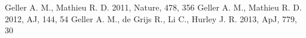 \documentclass{aastex62}
\begin{document}
\begin{thebibliography}{}
  Geller A. M., Mathieu R. D. 2011, Nature, 478, 356
 Geller A. M., Mathieu R. D. 2012, AJ, 144, 54
 Geller A. M.,
de Grijs R., Li C., Hurley J. R. 2013, ApJ, 779, 30

\end{thebibliography}
\end{document}
